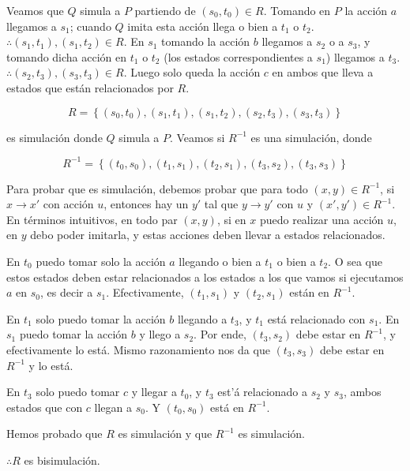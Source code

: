 \documentclass[a4paper, 12pt]{article}
\begin{document}
Veamos que $Q$ simula a $P$ partiendo de $(s_0, t_0) \in R$. Tomando en $P$ la acción
$a$ llegamos a $s_1$; cuando $Q$ imita esta acción llega o bien a $t_1$ o $t_2$.
$\therefore (s_1, t_1), (s_1, t_2) \in R$. En $s_1$ tomando la acción $b$
llegamos a $s_2$ o a $s_3$, y tomando dicha acción en $t_1$ o $t_2$ (los estados
correspondientes a $s_1$) llegamos a $t_3$. $\therefore (s_2, t_3), (s_3, t_3)
\in R$. Luego solo queda la acción $c$ en ambos que lleva a estados que están
relacionados por $R$. 

\begin{equation*}
    R = \left\{ (s_0, t_0), (s_1, t_1), (s_1, t_2), (s_2, t_3), (s_3, t_3) \right\} 
\end{equation*}

es simulación donde $Q$ simula a $P$. Veamos si $R^{-1}$ es una simulación,
donde 

\begin{equation*}
    R^{-1} = \left\{ (t_0, s_0), (t_1, s_1), (t_2, s_1), (t_3, s_2), (t_3, s_3) \right\} 
\end{equation*}

Para probar que es simulación, debemos probar que para todo $(x, y) \in R^{-1}$,
si $x \to x'$ con acción $u$, entonces hay un $y'$ tal que $y \to y'$ con $u$ y
$(x', y') \in R^{-1}$. En términos intuitivos, en todo par $(x, y)$, si en $x$
puedo realizar una acción $u$, en $y$ debo poder imitarla, y estas acciones
deben llevar a estados relacionados.

En $t_0$ puedo tomar solo la acción $a$ llegando o bien a $t_1$ o bien a $t_2$.
O sea que estos estados deben estar relacionados a los estados a los que vamos
si ejecutamos $a$  en $s_0$, es decir a $s_1$. Efectivamente, $(t_1, s_1)$ y
$(t_2, s_1)$ están en $R^{-1}$.

En $t_1$ solo puedo tomar la acción $b$ llegando a $t_3$, y $t_1$ está
relacionado con $s_1$. En $s_1$ puedo tomar la acción $b$ y llego a $s_2$. Por
ende, $(t_3, s_2)$ debe estar en $R^{-1}$, y efectivamente lo está. Mismo
razonamiento nos da que $(t_3, s_3)$ debe estar en $R^{-1}$ y lo está. 

En $t_3$ solo puedo tomar $c$ y llegar a $t_0$, y $t_3$ est'á relacionado a
$s_2$ y $s_3$, ambos estados que con $c$ llegan a $s_0$. Y $(t_0, s_0)$ está en
$R^{-1}$.

Hemos probado que $R$ es simulación y que $R^{-1}$ es simulación. 

$\therefore R$ es bisimulación.

\pagebreak 
\end{document}
